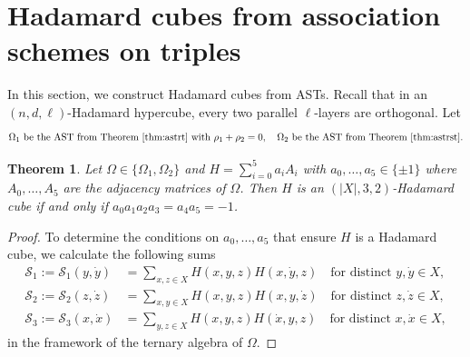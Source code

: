 \documentclass[11pt,oneside]{amsart}
\newtheorem{theorem}{Theorem}[section]
\begin{document}
{\section{Hadamard cubes from association schemes on triples}\label{sec:hcast}
In this section, we construct Hadamard cubes from ASTs.  
Recall that in an  $(n,d,\ell)$-Hadamard hypercube,  every two parallel $\ell$-layers are orthogonal. Let 
\[
\Omega_1 \text{ be the AST from Theorem~\ref{thm:astrt} with } \rho_1+\rho_2=0, \quad 
\Omega_2 \text{ be the AST from Theorem~\ref{thm:astrst}}.
\]
\begin{theorem}\label{thm:hcube}
Let $\Omega \in \{\Omega_1,\Omega_2\}$ and $H = \sum_{i=0}^5 a_i A_i$ with $a_0,\dots,a_5 \in \{\pm 1\}$ where $A_0,\dots,A_5$ are the adjacency matrices of $\Omega$. Then $H$ is an $(|X|,3,2)$-Hadamard cube if and only if $a_0 a_1 a_2 a_3 = a_4 a_5 = -1$. 
\end{theorem}
\begin{proof}
To determine the conditions on $a_0,\ldots,a_5$ that ensure $H$ is a Hadamard cube, we calculate the following sums
\begin{align*}
\mathscr{S}_1:= \mathscr{S}_1(y,\dot y) &=  \sum_{x,z\in X} H(x,y,z)H(x,\dot{y},z)  \quad \text{for distinct }y,\dot y\in X,\\
\mathscr{S}_2:= \mathscr{S}_2(z,\dot z) &=  \sum_{x,y\in X} H(x,y,z)H(x,y,\dot{z})  \quad \text{for distinct }z,\dot z\in X,\\
\mathscr{S}_3:= \mathscr{S}_3(x,\dot x) &= \sum_{y,z\in X} H(x,y,z)H(\dot{x},y,z) \quad \text{for distinct }x,\dot x\in X,
\end{align*} in the framework of the ternary algebra of $\Omega$. 



\end{proof}}
\end{document}
